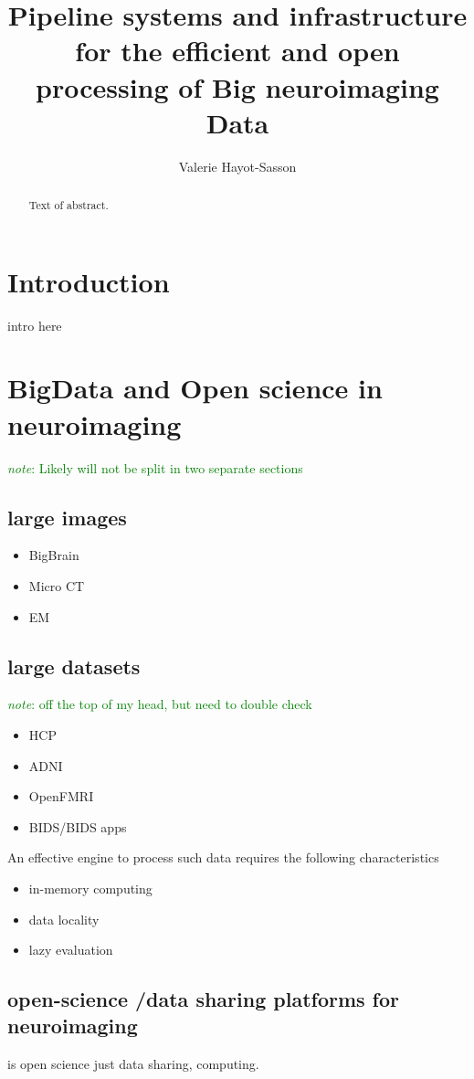 \documentclass{report}
\newcommand{\note}[1]{\textcolor{green}{\textit{note}: #1}}
\begin{document}
\title{Pipeline systems and infrastructure for the efficient and open processing of Big neuroimaging Data}
\author{Valerie Hayot-Sasson}
\maketitle
\begin{abstract}
  Text of abstract.  
\end{abstract}
\tableofcontents
\chapter{Introduction}
intro here
\chapter{BigData and Open science in neuroimaging}
    \note{Likely will not be split in two separate sections}
    \section{large images}
        \begin{itemize}  
            \item BigBrain
            \item Micro CT 
            \item EM 
        \end{itemize}
    \section{large datasets}
    	\note{off the top of my head, but need to double check}
        \begin{itemize}
            \item HCP
            \item ADNI
            \item OpenFMRI
            \item BIDS/BIDS apps
        \end{itemize}
    An effective engine to process such data requires the following characteristics
        \begin{itemize}
            \item in-memory computing
            \item data locality
            \item lazy evaluation
        \end{itemize}
        \section{open-science /data sharing platforms for neuroimaging}
        		is open science just data sharing, computing. 
\end{document}
